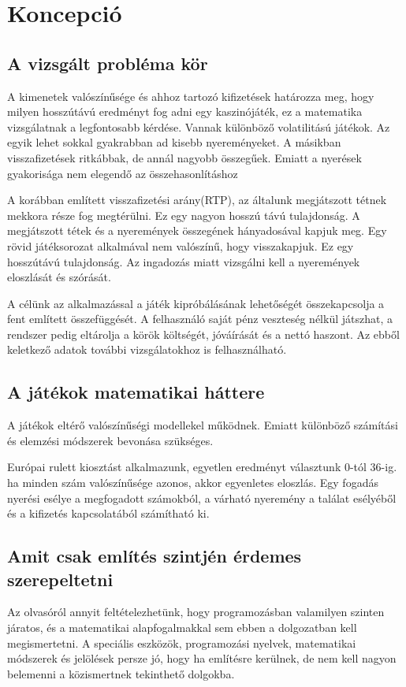\chapter{Koncepció}

\section{A vizsgált probléma kör}

A kimenetek valószínűsége és ahhoz tartozó kifizetések határozza meg, hogy milyen hosszútávú eredményt fog adni egy kaszinójáték, ez a matematika vizsgálatnak a legfontosabb kérdése.
Vannak különböző volatilitású játékok. Az egyik lehet sokkal gyakrabban ad kisebb nyereményeket. A másikban visszafizetések ritkábbak, de annál nagyobb összegűek. Emiatt a nyerések gyakorisága
nem elegendő az összehasonlításhoz

A korábban említett visszafizetési arány(RTP), az általunk megjátszott tétnek mekkora része fog megtérülni. Ez egy nagyon hosszú távú tulajdonság. A megjátszott tétek és a nyeremények összegének hányadosával kapjuk meg.
Egy rövid játéksorozat alkalmával nem valószínű, hogy visszakapjuk. Ez egy hosszútávú tulajdonság. Az ingadozás miatt vizsgálni kell a nyeremények eloszlását és szórását.

A célünk az alkalmazással a játék kipróbálásának lehetőségét összekapcsolja a fent említett összefüggését. A felhasználó saját pénz veszteség nélkül játszhat, a rendszer pedig eltárolja a körök költségét,
jóváírását és a nettó haszont. Az ebből keletkező adatok további vizsgálatokhoz is felhasználható.

\section{A játékok matematikai háttere}

A játékok eltérő valószínűségi modellekel működnek. Emiatt különböző számítási és elemzési módszerek bevonása szükséges.

Európai rulett kiosztást alkalmazunk, egyetlen eredményt választunk 0-tól 36-ig. ha minden szám valószínűsége azonos, akkor egyenletes eloszlás.
Egy fogadás nyerési esélye a megfogadott számokból, a várható nyeremény a találat esélyéből és a kifizetés kapcsolatából számítható ki.


\section{Amit csak említés szintjén érdemes szerepeltetni}

Az olvasóról annyit feltételezhetünk, hogy programozásban valamilyen szinten járatos, és a matematikai alapfogalmakkal sem ebben a dolgozatban kell megismertetni.
A speciális eszközök, programozási nyelvek, matematikai módszerek és jelölések persze jó, hogy ha említésre kerülnek, de nem kell nagyon belemenni a közismertnek tekinthető dolgokba.

